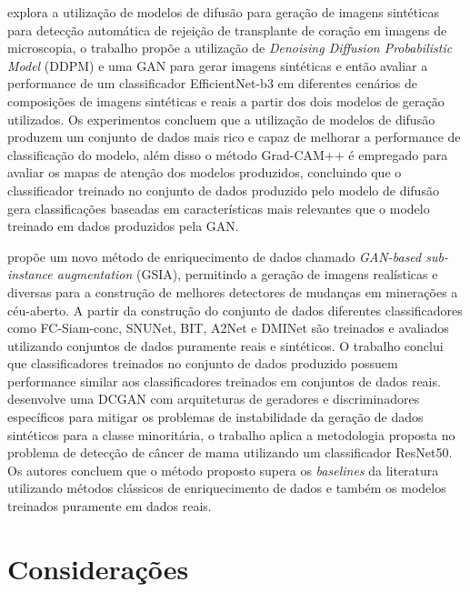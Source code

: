  explora a utilização de modelos de difusão para geração de imagens sintéticas para detecção automática de rejeição de transplante de coração em imagens de microscopia, o trabalho propõe a utilização de \textit{Denoising Diffusion Probabilistic Model} (DDPM) e uma GAN para gerar imagens sintéticas e então avaliar a performance de um classificador EfficientNet-b3 em diferentes cenários de composições de imagens sintéticas e reais a partir dos dois modelos de geração utilizados. Os experimentos concluem que a utilização de modelos de difusão produzem um conjunto de dados mais rico e capaz de melhorar a performance de classificação do modelo, além disso o método Grad-CAM++ é empregado para avaliar os mapas de atenção dos modelos produzidos, concluindo que o classificador treinado no conjunto de dados produzido pelo modelo de difusão gera classificações baseadas em características mais relevantes que o modelo treinado em dados produzidos pela GAN.

 propõe um novo método de enriquecimento de dados chamado \textit{GAN-based sub-instance augmentation} (GSIA), permitindo a geração de imagens realísticas e diversas para a construção de melhores detectores de mudanças em minerações a céu-aberto. A partir da construção do conjunto de dados diferentes classificadores como FC-Siam-conc, SNUNet, BIT, A2Net e DMINet são treinados e avaliados utilizando conjuntos de dados puramente reais e sintéticos. O trabalho conclui que classificadores treinados no conjunto de dados produzido possuem performance similar aos classificadores treinados em conjuntos de dados reais.
 desenvolve uma DCGAN com arquiteturas de geradores e discriminadores específicos para mitigar os problemas de instabilidade da geração de dados sintéticos para a classe minoritária, o trabalho aplica a metodologia proposta no problema de detecção de câncer de mama utilizando um classificador ResNet50. Os autores concluem que o método proposto supera os \textit{baselines} da literatura utilizando métodos clássicos de enriquecimento de dados e também os modelos treinados puramente em dados reais.

\section{Considerações} \label{RevConsideracoes}

